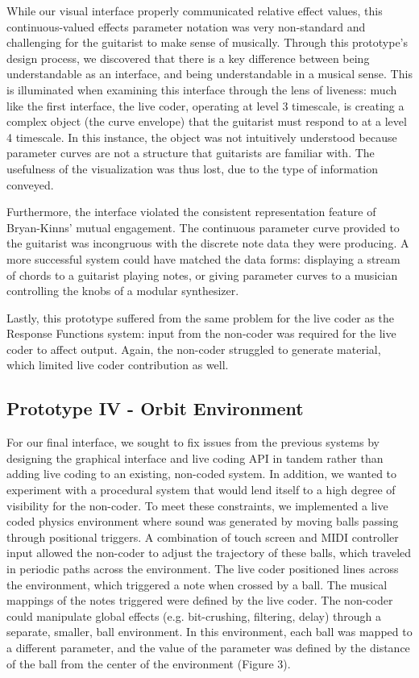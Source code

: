 \documentclass{nime-alternate}
\begin{document}
While our visual interface properly communicated relative effect values, this continuous-valued effects parameter notation was very non-standard and challenging for the guitarist to make sense of musically. Through this prototype's design process, we discovered that there is a key difference between being understandable as an interface, and being understandable in a musical sense. This is illuminated when examining this interface through the lens of liveness: much like the first interface, the live coder, operating at level 3 timescale, is creating a complex object (the curve envelope) that the guitarist must respond to at a level 4 timescale. In this instance, the object was not intuitively understood because parameter curves are not a structure that guitarists are familiar with. The usefulness of the visualization was thus lost, due to the type of information conveyed.

Furthermore, the interface violated the consistent representation feature of Bryan-Kinns' mutual engagement. The continuous parameter curve provided to the guitarist was incongruous with the discrete note data they were producing. A more successful system could have matched the data forms: displaying a stream of chords to a guitarist playing notes, or giving parameter curves to a musician controlling the knobs of a modular synthesizer. 

Lastly, this prototype suffered from the same problem for the live coder as the Response Functions system: input from the non-coder was required for the live coder to affect output. Again, the non-coder struggled to generate material, which limited live coder contribution as well.

\subsection{Prototype IV - Orbit Environment}
For our final interface, we sought to fix issues from the previous systems by designing the graphical interface and live coding API in tandem rather than adding live coding to an existing, non-coded system. In addition, we wanted to experiment with a procedural system that would lend itself to a high degree of visibility for the non-coder. To meet these constraints, we implemented a live coded physics environment where sound was generated by moving balls passing through positional triggers. A combination of touch screen and MIDI controller input allowed the non-coder to adjust the trajectory of these balls, which traveled in periodic paths across the environment. The live coder positioned lines across the environment, which triggered a note when crossed by a ball. The musical mappings of the notes triggered were defined by the live coder. The non-coder could manipulate global effects (e.g. bit-crushing, filtering, delay) through a separate, smaller, ball environment. In this environment, each ball was mapped to a different parameter, and the value of the parameter was defined by the distance of the ball from the center of the environment (Figure 3).
\end{document}
